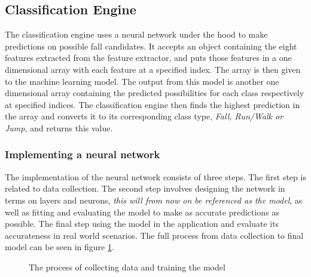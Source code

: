 \documentclass[12pt, a4paper, onecolumn]{article}
\begin{document}
	
	\subsection{Classification Engine} \label{section:classification-engine}
	
	The classification engine uses a neural network under the hood to make predictions on possible fall candidates. It accepts an object containing the eight features extracted from the feature extractor, and puts those features in a one dimensional array with each feature at a specified index. The array is then given to the machine learning model. The output from this model is another one dimensional array containing the predicted possibilities for each class respectively at specified indices. The classification engine then finds the highest prediction in the array and converts it to its corresponding class type, \textit{Fall, Run/Walk or Jump}, and returns this value.
	
	\subsubsection{Implementing a neural network}
	The implementation of the neural network consists of three steps. The first step is related to data collection. The second step involves designing the network in terms on layers and neurons, \textit{this will from now on be referenced as the model}, as well as fitting and evaluating the model to make as accurate predictions as possible. The final step using the model in the application and evaluate its accurateness in real world scenarios. The full process from data collection to final model can be seen in figure \ref{fig:training-model}.
	
	\begin{figure}[H]
		\centering
		\caption{The process of collecting data and training the model}%
		\label{fig:training-model}%
	\end{figure}
	
\end{document}
